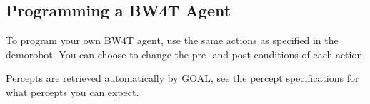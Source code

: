 \documentclass[11pt,a4paper]{article}
\begin{document}
%

\subsection{Programming a BW4T Agent}
To program your own BW4T agent, use the same actions as specified in the demorobot. You can  choose to change the pre- and post conditions of each action.

Percepts are retrieved automatically by GOAL, see the percept specifications for what percepts you can expect.
\end{document}

